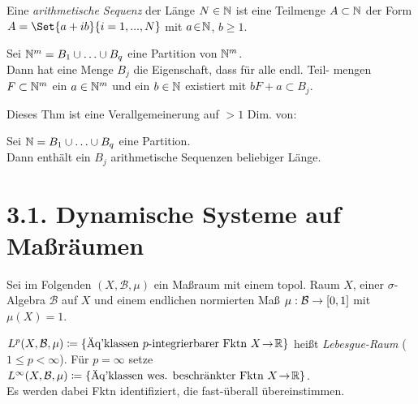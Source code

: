 \documentclass{cheat-sheet}
\newcommand{\Bor}{\mathcal{B}} %
\begin{document}

\begin{defn}
  Eine \emph{arithmetische Sequenz} der Länge $N \in \mathbb{N}$ ist eine Teilmenge $A \subset \mathbb{N}$ der Form $A = \Set{a + ib}{i = 1, \nldots, N}$ mit $a \!\in\! \mathbb{N}$, $b \!\geq\! 1$.
\end{defn}

\begin{thm}
  Sei $\mathbb{N}^m = B_1 \cup \ldots \cup B_q$ eine Partition von $\mathbb{N}^m$. \\
  Dann hat eine Menge $B_j$ die Eigenschaft, dass für alle endl. Teil- mengen $F \subset \mathbb{N}^m$ ein $a \in \mathbb{N}^m$ und ein $b \in \mathbb{N}$ existiert mit $bF + a \subset B_j$.
\end{thm}

\begin{bem}
  Dieses Thm ist eine Verallgemeinerung auf $>\!1$ Dim. von:
\end{bem}

\begin{thm}
  Sei $\mathbb{N} = B_1 \cup \ldots \cup B_q$ eine Partition. \\
  Dann enthält ein $B_j$ arithmetische Sequenzen beliebiger Länge.
\end{thm}





\section{3.1. Dynamische Systeme auf Maßräumen}

\begin{bem}
  Sei im Folgenden $(X, \Bor, \mu)$ ein Maßraum mit einem topol. Raum $X$, einer $\sigma$-Algebra $\Bor$ auf $X$ und einem endlichen normierten Maß $\mu : \Bor \to \cinterval{0}{1}$ mit $\mu(X) = 1$.
\end{bem}

\begin{nota}
  $L^p(X, \Bor, \mu) \coloneqq \{ \text{Äq'klassen $p$-integrierbarer Fktn $X \!\to\! \R$} \}$ heißt \emph{Lebesgue-Raum} ($1 \leq p < \infty$). Für $p = \infty$ setze
  $L^\infty(X, \Bor, \mu) \coloneqq \{ \text{Äq'klassen wes. beschränkter Fktn $X \!\to\! \R$} \}$. \\
  Es werden dabei Fktn identifiziert, die fast-überall übereinstimmen.
\end{nota}
\end{document}
